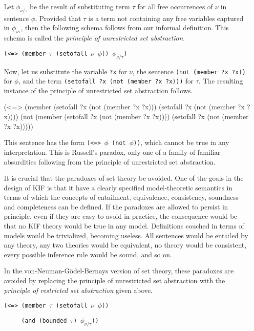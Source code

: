 Let $\phi_{\nu/\tau}$ be the result of substituting term $\tau$ for
all free occurrences of $\nu$ in sentence $\phi$.  Provided that
$\tau$ is a term not containing any free variables captured in
$\phi_{\nu\tau}$, then the following schema follows from our informal
definition.  This schema is called the {\it principle of unrestricted
set abstraction}.

\medskip
{\tt (<=> (member $\tau$ (setofall $\nu$ $\phi$)) $\phi_{\nu/\tau}$)}
\medskip

Now, let us substitute the variable {\tt ?x} for $\nu$, the sentence
{\tt (not (member ?x ?x))} for $\phi$,  and the term {\tt (setofall
?x (not (member ?x ?x)))} for $\tau$.  The resulting instance of
the principle of unrestricted set abstraction follows.

\medskip
\beginverbatim
(<=> (member (setofall ?x (not (member ?x ?x)))
             (setofall ?x (not (member ?x ?x))))
     (not (member (setofall ?x (not (member ?x ?x))))
                  (setofall ?x (not (member ?x ?x)))))
\endverbatim
\medskip

This sentence has the form {\tt (<=> $\phi$ (not $\phi$))}, which
cannot be true in any interpretation.  This is Russell's paradox, only
one of a family of familiar absurdities following from the principle of
unrestricted set abstraction.

It is crucial that the paradoxes of set theory be avoided.  One of the
goals in the design of KIF is that it have a clearly specified
model-theoretic semantics in terms of which the concepts of
entailment, equivalence, consistency, soundness and completeness can
be defined.  If the paradoxes are allowed to persist in principle,
even if they are easy to avoid in practice, the consequence would be
that no KIF theory would be true in any model.  Definitions couched in
terms of models would be trivialized, becoming useless.  All sentences
would be entailed by any theory, any two theories would be equivalent,
no theory would be consistent, every possible inference rule would be
sound, and so on.

In the von-Neuman-G\"odel-Bernays version of set theory, these paradoxes
are avoided by replacing the principle of unrestricted set abstraction with
the {\it principle of restricted set abstraction} given above.

\medskip
{\tt (<=> (member $\tau$ (setofall $\nu$ $\phi$))}\par
{\tt \ \ \ \ \ (and (bounded $\tau$) $\phi_{\nu/\tau}$))}\par
\medskip

